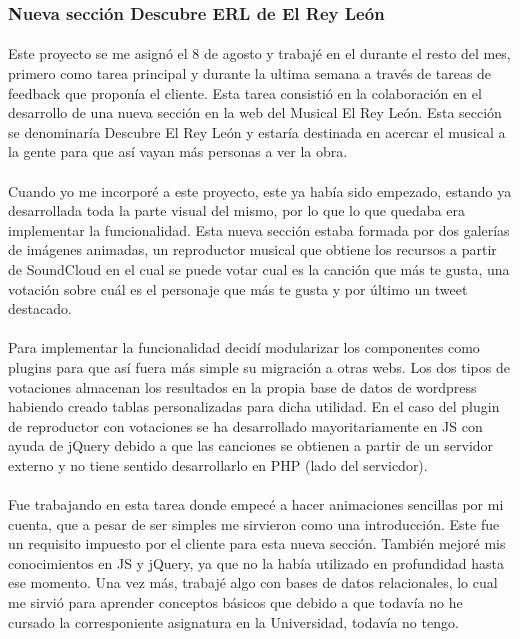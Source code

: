 \documentclass[10pt, a4paper,spanish]{article}
\begin{document}
            \subsubsection{Nueva sección Descubre ERL de El Rey León}

                \paragraph{}
                Este proyecto se me asignó el 8 de agosto y trabajé en el durante el resto del mes, primero como tarea principal y durante la ultima semana a través de tareas de feedback que proponía el cliente. Esta tarea consistió en la colaboración en el desarrollo de una nueva sección en la web del Musical El Rey León. Esta sección se denominaría Descubre El Rey León y estaría destinada en acercar el musical a la gente para que así vayan más personas a ver la obra.

                \paragraph{}
                Cuando yo me incorporé a este proyecto, este ya había sido empezado, estando ya desarrollada toda la parte visual del mismo, por lo que lo que quedaba era implementar la funcionalidad. Esta nueva sección estaba formada por dos galerías  de imágenes animadas, un reproductor musical que obtiene los recursos a partir de SoundCloud en el cual se puede votar cual es la canción que más te gusta, una votación sobre cuál es el personaje que más te gusta y por último un tweet destacado.

                \paragraph{}
                Para implementar la funcionalidad decidí modularizar los componentes como plugins para que así fuera más simple su migración a otras webs. Los dos tipos de votaciones almacenan los resultados en la propia base de datos de wordpress habiendo creado tablas personalizadas para dicha utilidad. En el caso del plugin de reproductor con votaciones se ha desarrollado mayoritariamente en JS con ayuda de jQuery debido a que las canciones se obtienen a partir de un servidor externo y no tiene sentido desarrollarlo en PHP (lado del servicdor).

                \paragraph{}
                Fue trabajando en esta tarea donde empecé a hacer animaciones sencillas por mi cuenta, que a pesar de ser simples me sirvieron como una introducción. Este fue un requisito impuesto por el cliente para esta nueva sección. También mejoré mis conocimientos en JS y jQuery, ya que no la había utilizado en profundidad hasta ese momento. Una vez más, trabajé algo con bases de datos relacionales, lo cual me sirvió para aprender conceptos básicos que debido a que todavía no he cursado la corresponiente asignatura en la Universidad, todavía no tengo.
\end{document}
